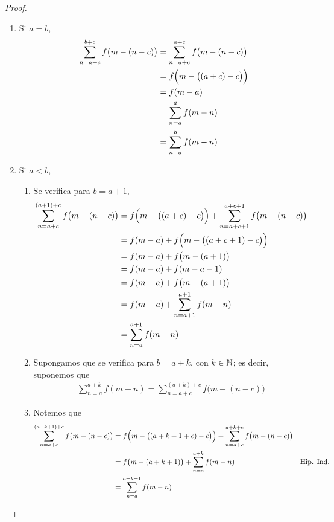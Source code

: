 \begin{enumerate}[label=\alph*)]
\begin{proof}
\begin{enumerate}[label=\roman*)]
    \item Si $a=b$,
    \begin{align*}
      \sum_{n=a+c}^{b+c} f\bigl(m-(n-c)\bigr) &= \sum_{n=a+c}^{a+c} f\bigl(m-(n-c)\bigr)\\
      &= f\Bigl(m-\bigl((a+c)-c\bigr)\Bigr)\\
      &= f(m-a)\\
      &= \sum_{n=a}^a f(m-n)\\
      &= \sum_{n=a}^b f(m-n)
    \end{align*}

    \item Si $a<b$,
    \begin{enumerate}[label=\roman*)]
      \item Se verifica para $b=a+1$,
      \begin{align*}
        \sum_{n=a+c}^{(a+1)+c} f\bigl(m-(n-c)\bigr) &= f\Bigl(m-\bigl((a+c)-c\bigr)\Bigr) + \sum_{n=a+c+1}^{a+c+1} f\bigl(m-(n-c)\bigr)\\
        &= f(m-a) + f\Bigl(m-\bigl((a+c+1)-c\bigr)\Bigr)\\
        &= f(m-a) + f\bigl(m-(a+1)\bigr)\\
        &= f(m-a) + f(m-a-1)\\
        &= f(m-a) + f\bigl(m-(a+1)\bigr)\\
        &= f(m-a) + \sum_{n=a+1}^{a+1} f(m-n)\\
        &= \sum_{n=a}^{a+1} f(m-n)
      \end{align*}

      \item Supongamos que se verifica para $b=a+k$, con $k\in \mathbb{N}$; es decir, suponemos que
      \begin{align*}
        \sum_{n=a}^{a+k} f(m-n) = \sum_{n=a+c}^{(a+k)+c} f\bigl(m-(n-c)\bigr)
      \end{align*}

      \item Notemos que
      \begin{align*}
        \sum_{n=a+c}^{(a+k+1)+c} f\bigl(m-(n-c)\bigr) &= f\Bigl(m-\bigl((a+k+1+c)-c\bigr)\Bigr) + \sum_{n=a+c}^{a+k+c} f\bigl(m-(n-c)\bigr)\\
        &= f\bigl(m-(a+k+1)\bigr) + \sum_{n=a}^{a+k} f(m-n) && \text{Hip. Ind.}\\
        &= \sum_{n=a}^{a+k+1} f(m-n)
      \end{align*}
    \end{enumerate}
  \end{enumerate}
  \end{proof}


\end{enumerate}
